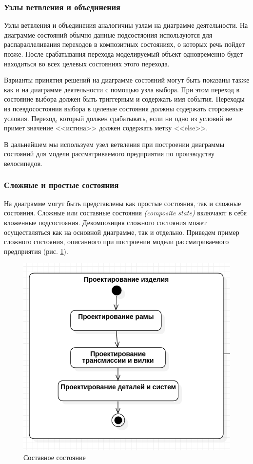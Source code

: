 \documentclass[a4paper,12pt]{extreport}
\begin{document}
\subsubsection*{Узлы ветвления и объединения}
Узлы ветвления и объединения аналогичны узлам на диаграмме деятельности. На диаграмме состояний обычно данные подсостяония используются для распараллеливания переходов в композитных состояниях, о которых речь пойдет позже. После срабатывания перехода моделируемый объект одновременно будет находиться во всех целевых состояниях этого перехода. 

Варианты принятия решений на диаграмме состояний могут быть показаны также как и на диаграмме деятельности с помощью узла выбора. При этом переход в состояние выбора должен быть триггерным и содержать имя события. Переходы из псевдосостояния выбора в целевые состояния должны содержать сторожевые условия. Переход, который должен срабатывать, если ни одно из условий не примет значение <<истина>> должен содержать метку <<else>>. 

В дальнейшем мы используем узел ветвления при построении диаграммы состояний для модели рассматриваемого предприятия по производству велосипедов.

\subsubsection*{Сложные и простые состояния}

На диаграмме могут быть представлены как простые состояния, так и сложные состояния. Сложные или составные состояния \textit{(composite state)}  включают в себя вложенные подсостояния.  Декомпозиция сложного состояния может осуществляться как на основной диаграмме, так и отдельно. Приведем пример сложного состояния, описанного при построении модели рассматриваемого предприятия (рис. \ref{fig:statechartcomposestate}).

\begin{figure}
	\centering
	\includegraphics[width=0.4\linewidth]{images/statechartcomposestate}
	\caption{Составное состояние}
	\label{fig:statechartcomposestate}
\end{figure}
\end{document}
